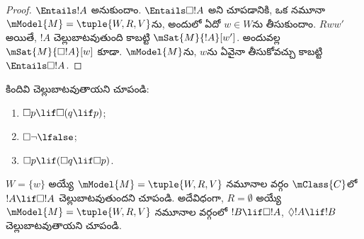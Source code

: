 \documentclass[../../../include/open-logic-section]{subfiles}
\begin{document}
\begin{proof}
  $\Entails !A$ అనుకుందాం. $\Entails \Box!A$ అని చూపడానికి,
  ఒక నమూనా $\mModel{M} = \tuple{W, R, V}$ను,
  అందులో ఏదో $w \in W$ను తీసుకుందాం. $Rww'$ అయితే, $!A$
  చెల్లుబాటవుతుంది కాబట్టి $\mSat{M}{!A}[w']$.
  అందువల్ల $\mSat{M}{\Box!A}[w]$ కూడా.
  $\mModel{M}$ను, $w$ను ఏవైనా తీసుకోవచ్చు కాబట్టి
  $\Entails \Box!A$.
\end{proof}

\begin{prob}
  కిందివి చెల్లుబాటవుతాయని చూపండి:
  \begin{enumerate}
  \item $\Box p \lif \Box (q \lif p)$;
  \item $\Box \lnot \lfalse$;
  \item $\Box p \lif (\Box q \lif \Box p)$.
  \end{enumerate}
\end{prob}

\begin{prob}
  $W = \{w\}$ అయ్యే $\mModel{M} = \tuple{W, R, V}$
  నమూనాల వర్గం $\mClass{C}$లో $!A \lif \Box!A$
  చెల్లుబాటవుతుందని చూపండి. అదేవిధంగా,
  $R = \emptyset$ అయ్యే $\mModel{M} = \tuple{W, R, V}$
  నమూనాల వర్గంలో $!B \lif \Box !A$, $\Diamond !A \lif !B$
  చెల్లుబాటవుతాయని చూపండి.
\end{prob}
\end{document}
